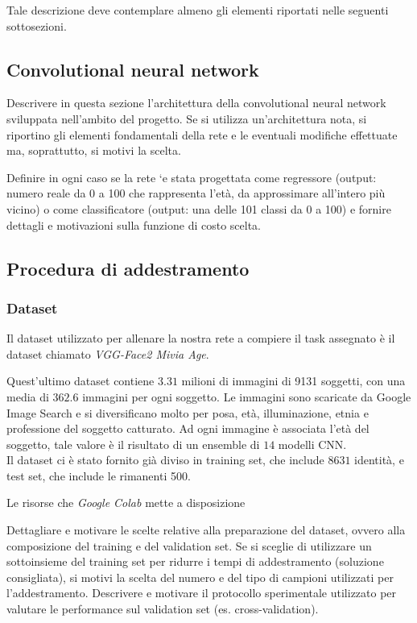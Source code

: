 Tale descrizione deve contemplare almeno gli elementi riportati nelle seguenti
sottosezioni.

\subsection{Convolutional neural network}
Descrivere in questa sezione l’architettura della convolutional neural network
sviluppata nell’ambito del progetto. Se si utilizza un’architettura nota, si riportino gli elementi fondamentali della rete e le eventuali modifiche effettuate ma, soprattutto, si motivi la scelta.

Definire in ogni caso se la rete `e stata progettata come regressore (output:
numero reale da 0 a 100 che rappresenta l’età, da approssimare all’intero più
vicino) o come classificatore (output: una delle 101 classi da 0 a 100) e fornire dettagli e motivazioni sulla funzione di costo scelta.

\subsection{Procedura di addestramento}
\subsubsection{Dataset}

Il dataset utilizzato per allenare la nostra rete a compiere il task assegnato è il dataset chiamato \emph{VGG-Face2 Mivia Age}.

Quest'ultimo dataset contiene $3.31$ milioni di immagini di 9131 soggetti, con una media di $362.6$ immagini per ogni soggetto. Le immagini sono scaricate da Google Image Search e si diversificano molto per posa, età, illuminazione, etnia e professione del soggetto catturato. Ad ogni immagine è associata l'età del soggetto, tale valore è il risultato di un ensemble di $14$ modelli CNN.\\
Il dataset ci è stato fornito già diviso in training set, che include $8631$ identità, e test set, che include le rimanenti 500.

 Le risorse che \textit{Google Colab} mette a disposizione 

Dettagliare e motivare le scelte relative alla preparazione del dataset, ovvero alla composizione del training e del validation set. Se si sceglie di utilizzare un sottoinsieme del training set per ridurre i tempi di addestramento (soluzione consigliata), si motivi la scelta del numero e del tipo di campioni utilizzati per l’addestramento. Descrivere e motivare il protocollo sperimentale utilizzato per valutare le performance sul validation set (es. cross-validation).

